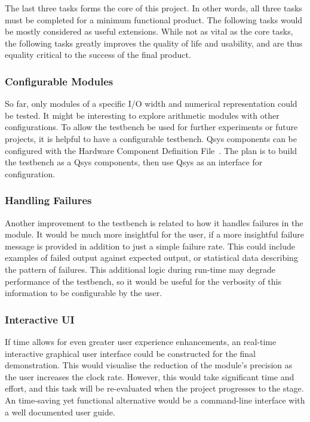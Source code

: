 The last three tasks forms the core of this project.
In other words, all three tasks must be completed for a minimum functional
product.
The following tasks would be mostly considered as useful extensions.
While not as vital as the core tasks, the following tasks greatly improves the
quality of life and usability, and are thus equality critical to the success
of the final product.

\subsubsection{\textbf{Configurable Modules}}
So far, only modules of a specific I/O width and numerical representation
could be tested.
It might be interesting to explore arithmetic modules with other configurations.
To allow the testbench be used for further experiments or future projects,
it is helpful to have a configurable testbench.
Qsys components can be configured with the Hardware Component Definition
File~\cite{Altera5}.
The plan is to build the testbench as a Qsys components, then use Qsys as an
interface for configuration.

\subsubsection{\textbf{Handling Failures}}
Another improvement to the testbench is related to how it handles failures
in the module.
It would be much more insightful for the user, if a more insightful failure
message is provided in addition to just a simple failure rate.
This could include examples of failed output against expected output,
or statistical data describing the pattern of failures.
This additional logic during run-time may degrade performance of the testbench,
so it would be useful for the verbosity of this information to be configurable
by the user.

\subsubsection{\textbf{Interactive UI}}
If time allows for even greater user experience enhancements, an real-time
interactive graphical user interface could be constructed for the final
demonstration.
This would visualise the reduction of the module's precision as the user
increases the clock rate.
However, this would take significant time and effort, and this task will
be re-evaluated when the project progresses to the stage.
An time-saving yet functional alternative would be a command-line interface
with a well documented user guide.

